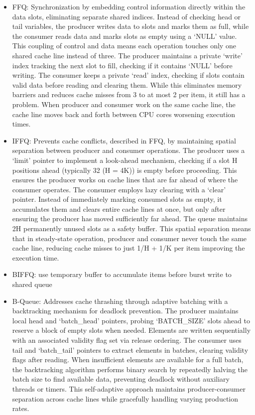 \begin{itemize}
   \item \ac{FFQ}: Synchronization by embedding control information directly within the data slots, eliminating separate shared indices. Instead of checking head or tail variables, the producer writes data to slots and marks them as full, while the consumer reads data and marks slots as empty using a \enquote*{NULL} value. This coupling of control and data means each operation touches only one shared cache line instead of three. The producer maintains a private \enquote*{write} index tracking the next slot to fill, checking if it contains \enquote*{NULL} before writing. The consumer keeps a private \enquote*{read} index, checking if slots contain valid data before reading and clearing them. While this eliminates memory barriers and reduces cache misses from 3 to at most 2 per item, it still has a problem. When producer and consumer work on the same cache line, the cache line moves back and forth between CPU cores worsening execution times. \cite{ffq}
   \item \ac{IFFQ}: Prevents cache conflicts, described in \ac{FFQ}, by maintaining spatial separation between producer and consumer operations. The producer uses a \enquote*{limit} pointer to implement a look-ahead mechanism, checking if a slot H positions ahead (typically 32 (H = 4K)) is empty before proceeding. This ensures the producer works on cache lines that are far ahead of where the consumer operates. The consumer employs lazy clearing with a \enquote*{clear} pointer. Instead of immediately marking consumed slots as empty, it accumulates them and clears entire cache lines at once, but only after ensuring the producer has moved sufficiently far ahead. The queue maintains 2H permanently unused slots as a safety buffer. This spatial separation means that in steady-state operation, producer and consumer never touch the same cache line, reducing cache misses to just 1/H + 1/K per item improving the execution time. \cite{MaffioneCacheAware}
   \item \ac{BIFFQ}: use temporary buffer to accumulate items before burst write to shared queue \cite{MaffioneCacheAware}
   \item B-Queue: Addresses cache thrashing through adaptive batching with a backtracking mechanism for deadlock prevention. The producer maintains local head and \enquote*{batch\_head} pointers, probing \enquote*{BATCH\_SIZE} slots ahead to reserve a block of empty slots when needed. Elements are written sequentially with an associated validity flag set via release ordering. The consumer uses tail and \enquote*{batch\_tail} pointers to extract elements in batches, clearing validity flags after reading. When insufficient elements are available for a full batch, the backtracking algorithm performs binary search by repeatedly halving the batch size to find available data, preventing deadlock without auxiliary threads or timers. This self-adaptive approach maintains producer-consumer separation across cache lines while gracefully handling varying production rates. \cite{Wang2013BQueue}

\end{itemize}

